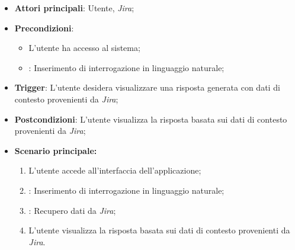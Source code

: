 \hypertarget{UC8.2}{}
\begin{itemize}
    \item \textbf{Attori principali}: Utente, \emph{Jira};
    \item \textbf{Precondizioni}: 
    \begin{itemize}
        \item L'utente ha accesso al sistema;
        \item {}: Inserimento di interrogazione in linguaggio naturale;
    \end{itemize}
    \item \textbf{Trigger}: L'utente desidera visualizzare una risposta generata con dati di contesto provenienti da \emph{Jira};
    \item \textbf{Postcondizioni}: L'utente visualizza la risposta basata sui dati di contesto provenienti da \emph{Jira};
    \item \textbf{Scenario principale:}
    \begin{enumerate}
        \item L'utente accede all'interfaccia dell'applicazione;
        \item {}: Inserimento di interrogazione in linguaggio naturale;
        \item {}: Recupero dati da \emph{Jira};
        \item L'utente visualizza la risposta basata sui dati di contesto provenienti da \emph{Jira}.
    \end{enumerate}
\end{itemize}

